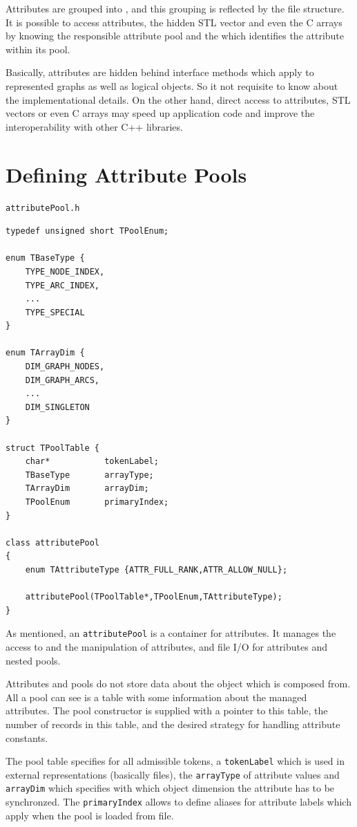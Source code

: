 \documentclass[a4paper,11pt,twoside]{book}
\begin{document}
\begin{multicols}{2}
Attributes are grouped into , and this grouping is reflected by the file
structure. It is possible to access attributes, the hidden STL vector and even
the C arrays by knowing the responsible attribute pool and the  which
identifies the attribute within its pool.

Basically, attributes are hidden behind interface methods which apply to
represented graphs as well as logical objects. So it not requisite to know about
the implementational details. On the other hand, direct access to attributes,
STL vectors or even C arrays may speed up application code and improve the
interoperability with other C++ libraries.


\section{Defining Attribute Pools}
\myinclude\verb/attributePool.h/
\begin{mymethods}
\begin{verbatim}
typedef unsigned short TPoolEnum;

enum TBaseType {
    TYPE_NODE_INDEX,
    TYPE_ARC_INDEX,
    ...
    TYPE_SPECIAL
}

enum TArrayDim {
    DIM_GRAPH_NODES,
    DIM_GRAPH_ARCS,
    ...
    DIM_SINGLETON
}

struct TPoolTable {
    char*           tokenLabel;
    TBaseType       arrayType;
    TArrayDim       arrayDim;
    TPoolEnum       primaryIndex;
}

class attributePool
{
    enum TAttributeType {ATTR_FULL_RANK,ATTR_ALLOW_NULL};

    attributePool(TPoolTable*,TPoolEnum,TAttributeType);
}
\end{verbatim}
\end{mymethods}
As mentioned, an \verb/attributePool/ is a container for attributes. It manages
the access to and the manipulation of attributes, and file I/O for attributes and
nested pools.

Attributes and pools do not store data about the object which is composed from.
All a pool can see is a table with some information about the managed
attributes. The pool constructor is supplied with a pointer to this table, the
number of records in this table, and the desired strategy for handling attribute
constants.

The pool table specifies for all admissible tokens, a \verb/tokenLabel/ which is
used in external representations (basically files), the \verb/arrayType/ of
attribute values and \verb/arrayDim/ which specifies with which object dimension
the attribute has to be synchronzed. The \verb/primaryIndex/ allows to define
aliases for attribute labels which apply when the pool is loaded from file.


\end{multicols}
\end{document}
